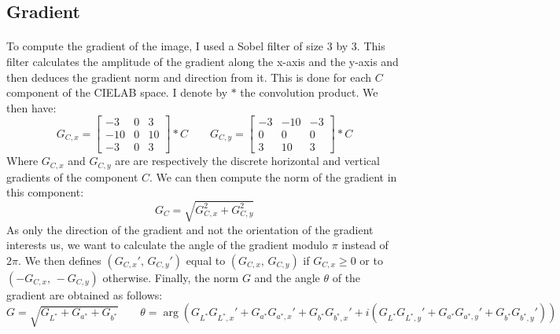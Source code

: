 \documentclass[10pt]{article}
\begin{document}
	\subsection{Gradient}
	
	\paragraph{}
	To compute the gradient of the image, I used a Sobel filter of size $3$ by $3$. This filter calculates the amplitude of the gradient along the x-axis and the y-axis and then deduces the gradient norm and direction from it. This is done for each $C$ component of the CIELAB space. I denote by $\ast$ the convolution product. We then have:
	$$ G_{C, x} = \begin{bmatrix} -3 & 0 & 3 \\ -10 & 0 & 10 \\ -3 & 0 & 3 \end{bmatrix} \ast C
		\qquad G_{C, y} = \begin{bmatrix} -3 & -10 & -3 \\ 0 & 0 & 0 \\ 3 & 10 & 3 \end{bmatrix} \ast C
	$$
	Where $G_{C, x}$ and $G_{C, y}$ are are respectively the discrete horizontal and vertical gradients of the component $C$. We can then compute the norm of the gradient in this component:
	$$ G_C = \sqrt{G_{C, x}^2 + G_{C, y}^2} $$
	As only the direction of the gradient and not the orientation of the gradient interests us, we want to calculate the angle of the gradient modulo $\pi$ instead of $2 \pi$. We then defines $(G_{C, x}', \, G_{C, y}')$ equal to $(G_{C, x}, \, G_{C, y})$ if $G_{C, x} \geqslant 0$ or to $(-G_{C, x}, \, -G_{C, y})$ otherwise. Finally, the norm $G$ and the angle $\theta$ of the gradient are obtained as follows:
	$$ G = \sqrt{G_{L^*} + G_{a^*} + G_{b^*}} \qquad \theta = \arg \left( G_{L^*} G_{L^*, x}' + G_{a^*} G_{a^*, x}' + G_{b^*} G_{b^*, x}' + i \left( G_{L^*} G_{L^*, y}' + G_{a^*} G_{a^*, y}' + G_{b^*} G_{b^*, y}' \right) \right)$$
	
\end{document}

